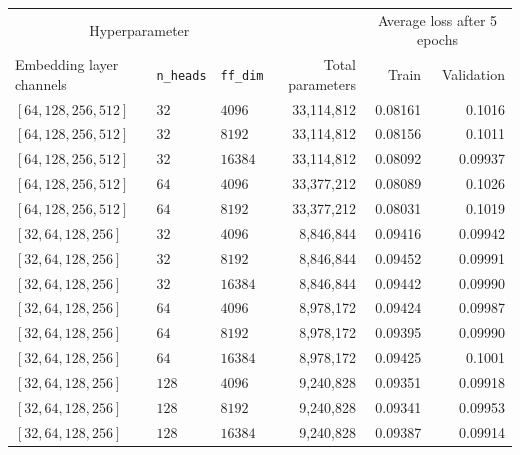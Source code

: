 \begin{table}[H]
  \centering
  \begin{adjustbox}{width=\textwidth}
    \begin{tabular}{lll|rrr}

      \multicolumn{3}{c}{Hyperparameter} && \multicolumn{2}{c}{Average loss
      after 5 epochs} \\

      Embedding layer channels & \texttt{n\_heads} & \texttt{ff\_dim} & Total
      parameters & Train & Validation\\

      \hline

      $[64, 128, 256, 512 ]$& $32$ & $4096$ & 33,114,812 & 0.08161 & 0.1016   \\
      $[64, 128, 256, 512 ]$& $32$ & $8192$ & 33,114,812 & 0.08156 & 0.1011 \\
      $[64, 128, 256, 512 ]$& $32$ & $16384$ & 33,114,812 & 0.08092 & 0.09937 \\[0.1cm]

      $[64, 128, 256, 512 ]$& $64$ & $4096$ & 33,377,212 & 0.08089 & 0.1026 \\
      $[64, 128, 256, 512 ]$& $64$ & $8192$ & 33,377,212 & 0.08031 & 0.1019 \\ [0.5cm]


      $[32, 64, 128, 256 ]$& $32$ & $4096$ & 8,846,844 & 0.09416 & 0.09942 \\
      $[32, 64, 128, 256 ]$& $32$ & $8192$ & 8,846,844 & 0.09452 & 0.09991 \\
      $[32, 64, 128, 256 ]$& $32$ & $16384$ & 8,846,844 & 0.09442 & 0.09990 \\[0.1cm]

      $[32, 64, 128, 256 ]$& $64$ & $4096$ & 8,978,172 & 0.09424 & 0.09987 \\
      $[32, 64, 128, 256 ]$& $64$ & $8192$ & 8,978,172 & 0.09395 & 0.09990 \\
      $[32, 64, 128, 256 ]$& $64$ & $16384$ & 8,978,172 & 0.09425 & 0.1001 \\[0.1cm]

      $[32, 64, 128, 256 ]$& $128$ & $4096$ & 9,240,828 & 0.09351 & 0.09918 \\
      $[32, 64, 128, 256 ]$& $128$ & $8192$ & 9,240,828 & 0.09341 & 0.09953 \\
      $[32, 64, 128, 256 ]$& $128$ & $16384$ & 9,240,828 & 0.09387 & 0.09914 \\[0.5cm]




\end{tabular}
\end{adjustbox}
\end{table}
